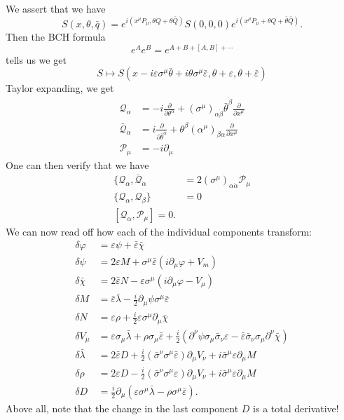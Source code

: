 \documentclass[a4paper]{article}
\begin{document}
We assert that we have
\[
  S(x, \theta, \bar{q}) = e^{i(x^\mu P_\mu, \theta Q + \theta \bar{Q})} S(0, 0, 0) e^{i (x^\mu P_\mu + \theta Q + \bar{\theta} \bar{Q})}.
\]
Then the BCH formula
\[
  e^A e^B = e^{A + B + [A, B] + \cdots}
\]
tells us we get
\[
  S \mapsto S(x -i \varepsilon \sigma^\mu \bar{\theta} + i \theta \sigma^\mu \bar{\varepsilon}, \theta + \varepsilon, \theta + \bar{\varepsilon})
\]
Taylor expanding, we get
\begin{align*}
  \mathcal{Q}_\alpha &= -i \frac{\partial}{\partial \theta^\alpha} + (\sigma^\mu)_{\alpha \dot{\beta}} \bar{\theta}^{\dot{\beta}} \frac{\partial}{\partial x^\mu}\\
  \bar{\mathcal{Q}}_{\dot{\alpha}} &= i \frac{\partial}{\partial \bar{\theta}^{\dot{\alpha}}} + \theta^\beta (\alpha^\mu)_{\beta \dot{\alpha}} \frac{\partial}{\partial x^\mu}\\
  \mathcal{P}_\mu &= -i \partial_\mu
\end{align*}
One can then verify that we have
\begin{align*}
  \{\mathcal{Q}_\alpha, \bar{\mathcal{Q}}_{\dot{\alpha}} &= 2 (\sigma^\mu)_{\alpha \dot{\alpha}} \mathcal{\mathcal{P}}_\mu\\ %
  \{\mathcal{Q}_\alpha, \mathcal{Q}_\beta\} &= 0\\
  [\mathcal{Q}_\alpha, \mathcal{P}_\mu] = 0.
\end{align*}
We can now read off how each of the individual components transform:
\begin{align*}
  \delta \varphi &= \varepsilon \psi + \bar{\varepsilon} \bar{\chi}\\
  \delta \psi &= 2 \varepsilon M + \sigma^\mu \bar{\varepsilon} (i \partial_\mu \varphi + V_m)\\
  \delta \bar{\chi} &= 2 \bar{\varepsilon} N - \varepsilon \sigma^\mu (i \partial_\mu \varphi - V_\mu)\\
  \delta M &= \bar{\varepsilon} \bar{\lambda} - \frac{i}{2} \partial_\mu \psi \sigma^\mu \bar{\varepsilon}\\
  \delta N &= \varepsilon \rho + \frac{i}{2} \varepsilon \sigma^\mu \partial_\mu \bar{\chi}\\
  \delta V_\mu &= \varepsilon \sigma_\mu \bar{\lambda} + \rho \sigma_\mu \bar{\varepsilon} + \frac{i}{2} (\partial^\nu \psi \sigma_\mu \bar{\sigma}_\nu \varepsilon - \bar{\varepsilon} \bar{\sigma}_\nu \sigma_\mu \partial^\nu \bar{\chi})\\
  \delta \bar{\lambda} &= 2 \bar{\varepsilon} D + \frac{i}{2} (\bar{\sigma}^\nu \sigma^\mu \bar{\varepsilon})\partial_\mu V_\nu + i \bar{\sigma}^\mu \varepsilon \partial_\mu M\\
  \delta \rho &= 2 \varepsilon D - \frac{i}{2} (\bar{\sigma}^\nu \sigma^\mu \varepsilon) \partial_\mu V_\nu + i \bar{\sigma}^\mu \varepsilon \partial_\mu M\\
  \delta D &= \frac{i}{2} \partial_\mu (\varepsilon \sigma^\mu \bar{\lambda} - \rho \sigma^\mu \bar{\varepsilon}).
\end{align*}
Above all, note that the change in the last component $D$ is a total derivative!
\end{document}
